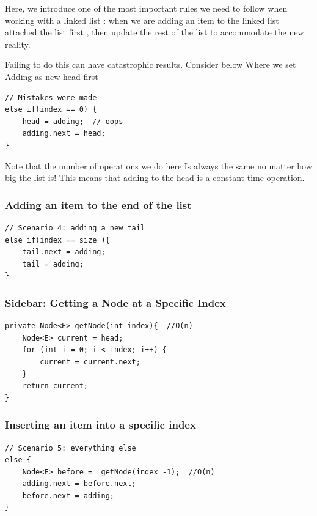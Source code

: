 \documentclass[10pt,a4paper]{book}
\begin{document}
Here, we introduce one of the most important rules we need to follow when working with a linked list : when we are adding an item to the linked list attached the list first , then update the rest of the list to accommodate the new reality.

Failing to do this can have catastrophic results.  Consider below Where we set Adding as new head first 



\begin{verbatim}
// Mistakes were made
else if(index == 0) {
	head = adding;  // oops
	adding.next = head;
}
\end{verbatim}




Note that the number of operations we do here Is always the same no matter how big the list is!  This means that adding to the head is a constant time operation.

\subsubsection{Adding an item to the end of the list}
\begin{verbatim}
// Scenario 4: adding a new tail
else if(index == size ){
	tail.next = adding;
	tail = adding;
}
\end{verbatim}


\subsubsection{Sidebar: Getting a Node at a Specific Index}
\begin{verbatim}
private Node<E> getNode(int index){  //O(n)
	Node<E> current = head;
	for (int i = 0; i < index; i++) {
		current = current.next;
	}
	return current;
}	
\end{verbatim}



\subsubsection{Inserting an item into a specific index}

\begin{verbatim}
// Scenario 5: everything else
else {
	Node<E> before =  getNode(index -1);  //O(n)
	adding.next = before.next;
	before.next = adding;
}	
\end{verbatim}
\end{document}
